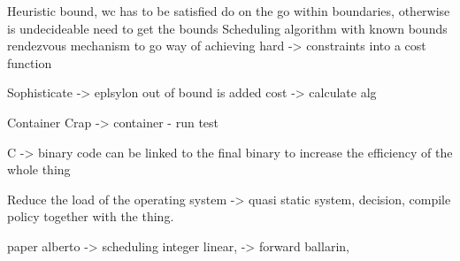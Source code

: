 \documentclass[]{scrartcl}
\begin{document}





Heuristic bound, wc has to be satisfied
do on the go within boundaries, otherwise is undecideable
need to get the bounds
Scheduling algorithm with known bounds
rendezvous mechanism to go 
way of achieving hard 
-> constraints into a cost function


Sophisticate -> eplsylon out of bound is added cost -> calculate alg

Container
Crap -> container - run test

C -> binary code can be linked to the final binary to increase the efficiency of the whole thing

Reduce the load of the operating system -> quasi static system, decision, compile policy together with the thing.

paper alberto -> scheduling integer linear,
-> forward 
ballarin, 
\end{document}
